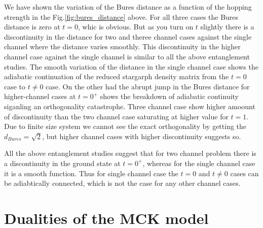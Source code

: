 \documentclass[reprint,prb,superscriptaddress]{revtex4-2}
\begin{document}
We have shown the variation of the Bures distance as a function of the hopping strength in the Fig.\ref{fig:bures_distance} above. For all three cases the Bures distance is zero at $t=0$, whic is obvious. But as you turn on $t$ slightly there is a discontinuity in the distance for two and theree channel cases against the single channel where the distance varies smoothly. This discontinuity in the higher channel case against the single channel is similar to all the above entanglement studies. The smooth variation of the distance in the single channel case shows the adiabatic continuation of the reduced stargarph density matrix from the $t=0$ case to $t\neq 0$ case. On the other had the abrupt jump in the Bures distance for higher-channel cases at $t=0^+$ shows the breakdown of adiabatic continuity siganling an orthogonality catastrophe. Three channel case show higher amoount of discontinuity than the two channel case saturating at higher value for $t=1$. Due to finite size system we cannot see the exact orthogonality by getting the $d_{Bures}=\sqrt{2}$, but higher channel cases with higher discontinuity suggests so.

\par All the above  entanglement studies suggest that for two channel problem there is a discontinuity in the ground state at $t=0^{+}$, whereas for the single channel case it is a smooth function. Thus for single channel case the $t=0$ and $t\neq 0$ cases can be adiabtically connected, which is not the case for any other channel cases. 

\section{Dualities of the MCK model}
\label{sec:duality}
\end{document}

